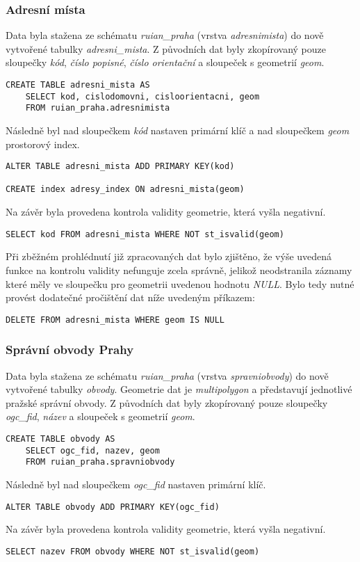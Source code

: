 \documentclass[a4paper, 12pt]{article}
\begin{document}
\subsubsection*{Adresní místa}
Data byla stažena ze schématu \textit{ruian\_praha} (vrstva \textit{adresnimista}) do nově vytvořené tabulky \textsl{adresni\_mista}. Z původních dat byly zkopírovaný pouze sloupečky \textsl{kód}, \textsl{číslo popisné}, \textsl{číslo orientační} a sloupeček s geometrií \textsl{geom}. 
\begin{lstlisting}
CREATE TABLE adresni_mista AS
    SELECT kod, cislodomovni, cisloorientacni, geom
    FROM ruian_praha.adresnimista
\end{lstlisting}
Následně byl nad sloupečkem \textsl{kód} nastaven primární klíč a nad sloupečkem \textsl{geom} prostorový index.
\begin{lstlisting}
ALTER TABLE adresni_mista ADD PRIMARY KEY(kod)

CREATE index adresy_index ON adresni_mista(geom)
\end{lstlisting}
Na závěr byla provedena kontrola validity geometrie, která vyšla negativní.
\begin{lstlisting}
SELECT kod FROM adresni_mista WHERE NOT st_isvalid(geom)
\end{lstlisting}
Při zběžném prohlédnutí již zpracovaných dat bylo zjištěno, že výše uvedená funkce na kontrolu validity nefunguje zcela správně, jelikož neodstranila záznamy které měly ve sloupečku pro geometrii uvedenou hodnotu \textit{NULL}. Bylo tedy nutné provést dodatečné pročištění dat níže uvedeným příkazem:
\begin{lstlisting}
DELETE FROM adresni_mista WHERE geom IS NULL
\end{lstlisting}

\subsubsection*{Správní obvody Prahy}
Data byla stažena ze schématu \textit{ruian\_praha} (vrstva \textit{spravniobvody}) do nově vytvořené tabulky \textsl{obvody}. Geometrie dat je \textit{multipolygon} a představují jednotlivé pražské správní obvody. Z původních dat byly zkopírovaný pouze sloupečky \textsl{ogc\_fid}, \textsl{název} a sloupeček s geometrií \textsl{geom}. 
\begin{lstlisting}
CREATE TABLE obvody AS
    SELECT ogc_fid, nazev, geom
    FROM ruian_praha.spravniobvody
\end{lstlisting}
Následně byl nad sloupečkem \textsl{ogc\_fid} nastaven primární klíč.
\begin{lstlisting}
ALTER TABLE obvody ADD PRIMARY KEY(ogc_fid)
\end{lstlisting}
Na závěr byla provedena kontrola validity geometrie, která vyšla negativní.
\begin{lstlisting}
SELECT nazev FROM obvody WHERE NOT st_isvalid(geom)
\end{lstlisting}
\end{document}
